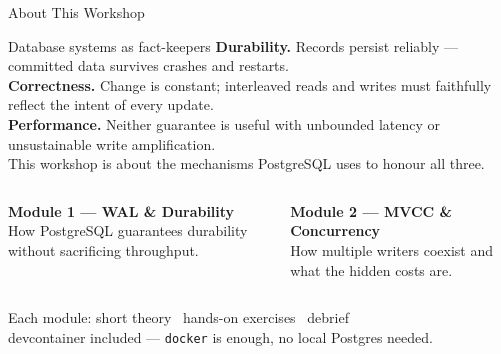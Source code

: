 \documentclass[aspectratio=169,10pt]{beamer}
\begin{document}
\begin{frame}{About This Workshop}

  \begin{block}{Database systems as fact-keepers}
    \textbf{Durability.} Records persist reliably ---
     committed data survives crashes and restarts.\\[0.3em]
    \textbf{Correctness.} Change is constant; interleaved reads and
     writes must faithfully reflect the intent of every update.\\[0.3em]
    \textbf{Performance.} Neither guarantee is useful with unbounded
     latency or unsustainable write amplification.\\[0.4em]
    {\small This workshop is about the mechanisms PostgreSQL uses
    to honour all three.}
  \end{block}
  \vspace{0.6em}
  \begin{columns}[T]
    \textbf{Module 1 --- WAL \& Durability}\\[0.2em]
    {\small How PostgreSQL guarantees durability without sacrificing throughput.}

    \textbf{Module 2 --- MVCC \& Concurrency}\\[0.2em]
    {\small How multiple writers coexist and what the hidden costs are.}
  \end{columns}

  \vspace{0.8em}
  \begin{center}
    {\small
    \faTools\enspace
    Each module: short theory \textrightarrow\ hands-on exercises \textrightarrow\ debrief\\[0.3em]
    \faDocker\enspace
    devcontainer included --- \texttt{docker} is enough, no local Postgres needed.
    }
  \end{center}
\end{frame}
\end{document}
